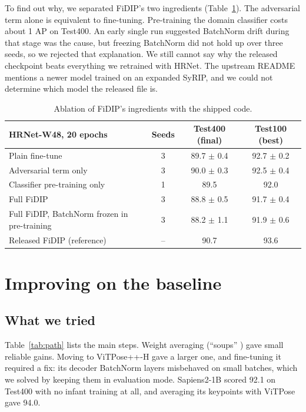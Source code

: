 \documentclass[11pt]{article}
\begin{document}
To find out why, we separated FiDIP's two ingredients (Table~\ref{tab:ablate}). The adversarial term alone is equivalent to fine-tuning. Pre-training the domain classifier costs about 1 AP on Test400. An early single run suggested BatchNorm drift during that stage was the cause, but freezing BatchNorm did not hold up over three seeds, so we rejected that explanation. We still cannot say why the released checkpoint beats everything we retrained with HRNet. The upstream README mentions a newer model trained on an expanded SyRIP, and we could not determine which model the released file is.

\begin{table}[h]
\centering\small
\begin{tabular}{@{}lccc@{}}
\toprule
HRNet-W48, 20 epochs & Seeds & Test400 (final) & Test100 (best) \\
\midrule
Plain fine-tune & 3 & 89.7 $\pm$ 0.4 & 92.7 $\pm$ 0.2 \\
Adversarial term only & 3 & 90.0 $\pm$ 0.3 & 92.5 $\pm$ 0.4 \\
Classifier pre-training only & 1 & 89.5 & 92.0 \\
Full FiDIP & 3 & 88.8 $\pm$ 0.5 & 91.7 $\pm$ 0.4 \\
Full FiDIP, BatchNorm frozen in pre-training & 3 & 88.2 $\pm$ 1.1 & 91.9 $\pm$ 0.6 \\
\midrule
Released FiDIP (reference) & -- & 90.7 & 93.6 \\
\bottomrule
\end{tabular}
\caption{Ablation of FiDIP's ingredients with the shipped code.}
\label{tab:ablate}
\end{table}

\section{Improving on the baseline}
\subsection{What we tried}
Table~\ref{tab:path} lists the main steps. Weight averaging (``soups'' \cite{soups}) gave small reliable gains. Moving to ViTPose++-H \cite{vitpose,vitposepp} gave a larger one, and fine-tuning it required a fix: its decoder BatchNorm layers misbehaved on small batches, which we solved by keeping them in evaluation mode. Sapiens2-1B \cite{sapiens2} scored 92.1 on Test400 with no infant training at all, and averaging its keypoints with ViTPose gave 94.0.
\end{document}
